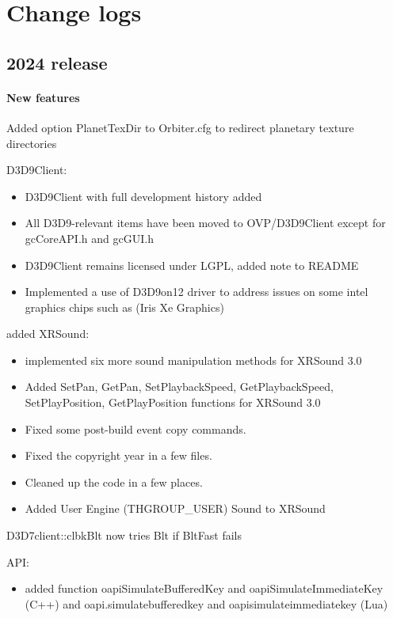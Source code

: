 \documentclass[Orbiter User Manual.tex]{subfiles}
\begin{document}
\section{Change logs}
\label{sec:changelog}

\subsection{2024 release}
\paragraph{New features}
\begin{itemize}
	\begin{sloppypar}%
	\item Added option PlanetTexDir to Orbiter.cfg to redirect planetary texture directories
	\item D3D9Client:
	\begin{itemize}
		\item D3D9Client with full development history added
		\item All D3D9-relevant items have been moved to OVP/D3D9Client except for gcCoreAPI.h and gcGUI.h
		\item D3D9Client remains licensed under LGPL, added note to README
		\item Implemented a use of D3D9on12 driver to address issues on some intel graphics chips such as (Iris Xe Graphics)
	\end{itemize}
	\item added XRSound:
	\begin{itemize}
		\item implemented six more sound manipulation methods for XRSound 3.0
		\item Added SetPan, GetPan, SetPlaybackSpeed, GetPlaybackSpeed, SetPlayPosition, GetPlayPosition functions for XRSound 3.0
		\item Fixed some post-build event copy commands.
		\item Fixed the copyright year in a few files.
		\item Cleaned up the code in a few places.
		\item Added User Engine (THGROUP\_USER) Sound to XRSound
	\end{itemize}
	\item D3D7client::clbkBlt now tries Blt if BltFast fails
	\item API:
	\begin{itemize}
		\item added function oapiSimulateBufferedKey and oapiSimulateImmediateKey (C++) and oapi.simulatebufferedkey and oapisimulateimmediatekey (Lua)

\end{itemize}
\end{sloppypar}
\end{itemize}
\end{document}
